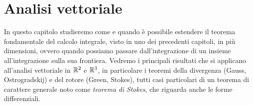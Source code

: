 \chapter{Analisi vettoriale}
In questo capitolo studieremo come e quando è possibile estendere il teorema fondamentale del calcolo integrale, visto in uno dei precedenti capitoli, in più dimensioni, ovvero quando possiamo passare dall'integrazione di un insieme all'integrazione sulla sua frontiera.
Vedremo i principali risultati che si applicano all'analisi vettoriale in $\mathbb{R}^2$ e $\mathbb{R}^3$, in particolare i teoremi della divergenza (Gauss, Ostrogradskij) e del rotore (Green, Stokes), tutti casi particolari di un teorema di carattere generale noto come \emph{teorema di Stokes}, che riguarda anche le forme differenziali.

